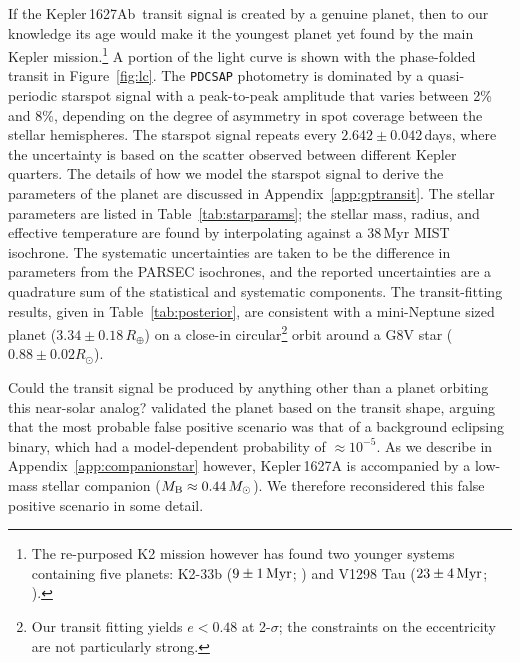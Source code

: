 \documentclass[12pt,modern,twocolumn,tighten]{aastex63}
\newcommand{\pn}{Kepler\,1627Ab} %
\begin{document}
If the \pn\ transit signal is created by a genuine planet,  then to
our knowledge its age would make it the youngest planet yet found by
the main Kepler mission.\footnote{The re-purposed K2 mission however
has found two younger systems containing five planets: K2-33b ($9\pm1\,{\rm Myr}$;
\citealt{Mann_K2_33b_2016,David_et_al_2017}) and V1298 Tau
($23\pm4\,{\rm Myr}$; \citealt{david_four_2019}).}  A portion of the
light curve is shown with the phase-folded transit in
Figure~\ref{fig:lc}.  The \texttt{PDCSAP} photometry is dominated by a
quasi-periodic starspot signal with a peak-to-peak amplitude that
varies between 2\% and 8\%, depending on the degree of asymmetry in
spot coverage between the stellar hemispheres.  The starspot signal
repeats every $2.642\pm0.042$\,days, where the uncertainty is based on
the scatter observed between different Kepler quarters.  The details
of how we model the starspot signal to derive the parameters of the
planet are discussed in Appendix~\ref{app:gptransit}.  The stellar
parameters are listed in Table~\ref{tab:starparams}; the stellar mass,
radius, and effective temperature are found by interpolating against a
38$\,$Myr MIST isochrone.  The systematic uncertainties are taken to
be the difference in parameters from the PARSEC isochrones, and the
reported uncertainties are a quadrature sum of the statistical and
systematic components.  The transit-fitting results, given in
Table~\ref{tab:posterior}, are consistent with a mini-Neptune sized
planet ($3.34\pm 0.18\,R_\oplus$) on a close-in circular\footnote{Our
transit fitting yields $e<0.48$ at 2-$\sigma$; the constraints on the
eccentricity are not particularly strong.} orbit around a G8V star
($0.88 \pm 0.02 R_\odot$).

Could the transit signal be produced by anything other than a planet
orbiting this near-solar analog?  \citet{morton_false_2016} validated
the planet based on the transit shape, arguing that the most probable 
false positive scenario was that of a background eclipsing binary,
which had a model-dependent probability of $\approx10^{-5}$.
As we describe in Appendix~\ref{app:companionstar} however,
Kepler\,1627A is accompanied by a low-mass stellar companion ($M_{\rm
B}\approx 0.44\,M_\odot$).  We therefore reconsidered this false
positive scenario in some detail. 

\end{document}
